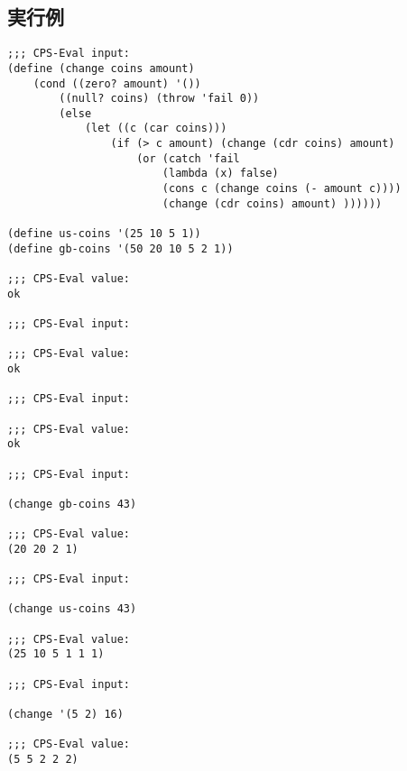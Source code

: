 \documentclass[a4paper,12pt]{article}
\begin{document}
\subsection{実行例}
{\small
\begin{verbatim}
;;; CPS-Eval input:
(define (change coins amount)
	(cond ((zero? amount) '())
		((null? coins) (throw 'fail 0))
		(else
			(let ((c (car coins)))
				(if (> c amount) (change (cdr coins) amount)
					(or (catch 'fail
						(lambda (x) false)
						(cons c (change coins (- amount c))))
						(change (cdr coins) amount) ))))))

(define us-coins '(25 10 5 1))
(define gb-coins '(50 20 10 5 2 1))

;;; CPS-Eval value:
ok

;;; CPS-Eval input:

;;; CPS-Eval value:
ok

;;; CPS-Eval input:

;;; CPS-Eval value:
ok

;;; CPS-Eval input:

(change gb-coins 43)

;;; CPS-Eval value:
(20 20 2 1)

;;; CPS-Eval input:

(change us-coins 43)

;;; CPS-Eval value:
(25 10 5 1 1 1)

;;; CPS-Eval input:

(change '(5 2) 16)

;;; CPS-Eval value:
(5 5 2 2 2)
\end{verbatim}
}
\end{document}
